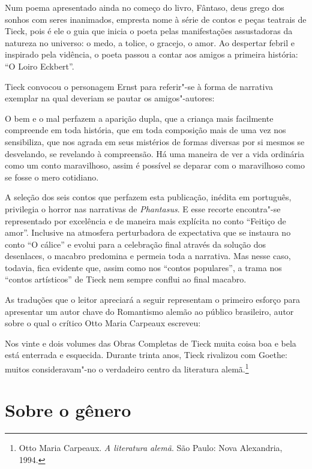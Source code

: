 Num poema apresentado ainda no começo do livro, Fântaso, deus grego dos
sonhos com seres inanimados, empresta nome à série de contos e peças
teatrais de Tieck, pois é ele o guia que inicia o poeta pelas
manifestações assustadoras da natureza no universo: o medo, a tolice, o
gracejo, o amor.  Ao despertar febril e inspirado pela vidência, o
poeta passou a contar aos amigos a primeira história: ``O Loiro Eckbert''.

Tieck convocou o personagem Ernst para referir"-se à forma de narrativa
exemplar na qual deveriam se pautar os amigos"-autores: 

\begin{hedraquote}
O bem e o mal perfazem a aparição dupla, que a criança mais facilmente
compreende em toda história, que em toda composição mais de uma vez nos
sensibiliza, que nos agrada em seus mistérios de formas diversas por si
mesmos se desvelando, se revelando à compreensão. Há uma maneira de ver
a vida \mbox{ordinária} como um conto maravilhoso, assim é possível se deparar
com o maravilhoso como se fosse o mero cotidiano.
\end{hedraquote}

A seleção dos seis contos que perfazem esta publicação, inédita em português,
privilegia o horror nas narrativas de 
\textit{Phantasus}. E esse recorte encontra"-se
representado por excelência e de maneira mais explícita no conto
``Feitiço de amor''. Inclusive na atmosfera perturbadora de expectativa que
se instaura no conto ``O cálice'' e evolui para a celebração final		
através da solução dos desenlaces, o macabro predomina e permeia toda a
narrativa. Mas nesse caso, todavia, fica evidente que, assim como nos
``contos populares'', a trama nos ``contos artísticos'' de Tieck nem sempre
conflui ao final macabro. 

As traduções que o leitor apreciará a seguir representam o primeiro esforço para 
apresentar um autor chave do Romantismo alemão ao público brasileiro, 
autor sobre o qual o crítico Otto Maria Carpeaux escreveu: 

\begin{hedraquote}
Nos vinte e dois volumes das Obras Completas de Tieck 
muita coisa boa e bela está enterrada e esquecida. Durante trinta anos, 
Tieck rivalizou com Goethe: muitos consideravam"-no o verdadeiro centro da
literatura alemã.\footnote{ Otto Maria Carpeaux. \textit{A literatura alemã}. 
São Paulo: Nova Alexandria, 1994.}
\end{hedraquote}

\section{Sobre o gênero}

